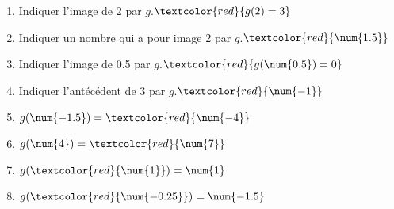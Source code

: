 \begin{corrige}
\begin{enumerate}
        \item Indiquer l'image de 2 par $g$.\hfill$\textcolor{red}{g(2)=3}$
        \item Indiquer un nombre qui a pour image 2 par $g$.\hfill$\textcolor{red}{\num{1.5}}$
        \item Indiquer l'image de \num{0,5} par $g$.\hfill$\textcolor{red}{g(\num{0.5})=0}$
        \item Indiquer l'antécédent de 3 par $g$.\hfill$\textcolor{red}{\num{-1}}$
        \item $g(\num{-1.5})=\textcolor{red}{\num{-4}}$
        \item $g(\num{4})=\textcolor{red}{\num{7}}$
        \item $g(\textcolor{red}{\num{1}})=\num{1}$
        \item $g(\textcolor{red}{\num{-0.25}})=\num{-1.5}$
    \end{enumerate}
\end{corrige}
